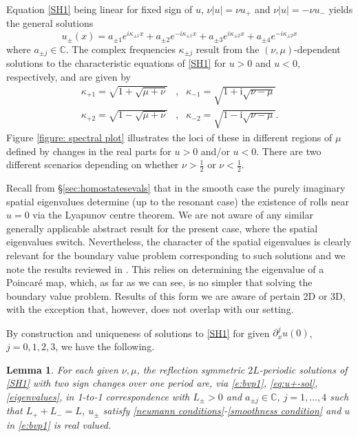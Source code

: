 \documentclass{article}
\numberwithin{equation}{section}
\newtheorem{lemma}[theorem]{Lemma}
\def\C{\mathbb{C}}
\def\rmi{\mathrm{i}}
\begin{document}
Equation \eqref{SH1} being linear for fixed sign of $u$, $\nu |u| = \nu u_+$ and $\nu |u| = -\nu u_-$ yields the general solutions  
		\begin{equation}\label{eq:u+-sol}
			u_\pm(x) = a_{\pm 1} e^{i \kappa_{\pm 1}x} +  a_{\pm 2} e^{-i \kappa_{\pm 1}x} +  a_{\pm 3} e^{i \kappa_{\pm 2}x} +  a_{\pm 4} e^{-i \kappa_{\pm 2}x}
		\end{equation}
		where $a_{\pm j}\in\C$. The complex frequencies $\kappa_{\pm j}$ result from the $(\nu,\mu)$-dependent solutions to the characteristic equations of \eqref{SH1} for $u>0$ and $u<0$, respectively, and are given by 
		\begin{equation}\label{eigenvalues}
			\begin{aligned}
				\kappa_{+1} = \sqrt{1 + \sqrt{\mu + \nu}} &,& \kappa_{-1} = \sqrt{1 + \rmi \sqrt{\nu - \mu}}\\
				\kappa_{+2} = \sqrt{1 - \sqrt{\mu + \nu}}  &,& \kappa_{-2} = \sqrt{1 -\rmi \sqrt{\nu - \mu}}.	
			\end{aligned}
		\end{equation} 
Figure \ref{figure: spectral plot} illustrates the loci of these in different regions of $\mu$ defined by changes in the real parts for $u>0$ and/or $u<0$. There are two different scenarios depending on whether $\nu>\frac 1 2$ or $\nu<\frac 1 2$. 

Recall from \S\ref{sec:homostatesevals} that in the smooth case the purely imaginary spatial eigenvalues determine (up to the resonant case) the existence of rolls near $u=0$ via the Lyapunov centre theorem.  We are not aware of any similar generally applicable abstract result for the present case, where the spatial eigenvalues switch. Nevertheless, the character of the spatial eigenvalues is clearly relevant for the boundary value problem corresponding to such solutions and we note the results reviewed in \cite{KuepperHoshamWeiss2013}. This relies on determining the eigenvalue of a Poincar\'e map, which, as far as we can see, is no simpler that solving the boundary value problem. Results of this form we are aware of pertain 2D or 3D, with the exception \cite{Hosham2018} that, however, does not overlap with our setting.  

By construction and uniqueness of solutions to \eqref{SH1} for given $\partial_x^ju(0)$, $j=0,1,2,3$, we have the following. 
\begin{lemma}\label{lem:symperBVP}
For each given $\nu,\mu$, the reflection symmetric $2L$-periodic solutions of \eqref{SH1} with two sign changes over one period are, via  \eqref{e:bvp1}, \eqref{eq:u+-sol}, \eqref{eigenvalues}, in 1-to-1 correspondence with $L_\pm>0$ and $a_{\pm j}\in\C$, $j=1,\ldots,4$ such that $L_++L_-=L$, $u_\pm$ satisfy \eqref{neumann conditions}-\eqref{smoothness condition} and $u$ in \eqref{e:bvp1} is real valued. 
\end{lemma}		
\end{document}
